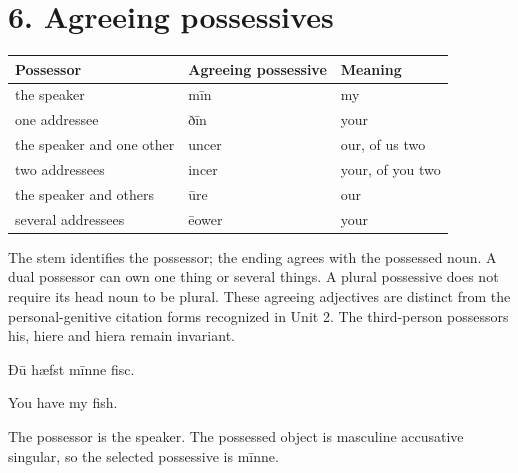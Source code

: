 \section*{6. Agreeing possessives}

\par\begingroup
\fontsize{10.5}{13.2}\selectfont
\setlength{\LTleft}{0pt}\setlength{\LTright}{\fill}
\noindent
\begin{tabular}{@{}>{\raggedright\arraybackslash}p{47.38mm}>{\raggedright\arraybackslash}p{39.74mm}>{\raggedright\arraybackslash}p{31.26mm}@{}}
\toprule
\textbf{Possessor} & \textbf{Agreeing possessive} & \textbf{Meaning} \\
\midrule
the speaker & mīn & my \\
one addressee & ðīn & your \\
the speaker and one other & uncer & our, of us two \\
two addressees & incer & your, of you two \\
the speaker and others & ūre & our \\
several addressees & ēower & your \\
\bottomrule
\end{tabular}
\par\endgroup

The stem identifies the possessor; the ending agrees with the possessed noun. A dual possessor can own one thing or several things. A plural possessive does not require its head noun to be plural. These agreeing adjectives are distinct from the personal-genitive citation forms recognized in Unit 2. The third-person possessors his, hiere and hiera remain invariant.

Ðū hæfst mīnne fisc.

You have my fish.

The possessor is the speaker. The possessed object is masculine accusative singular, so the selected possessive is mīnne.

